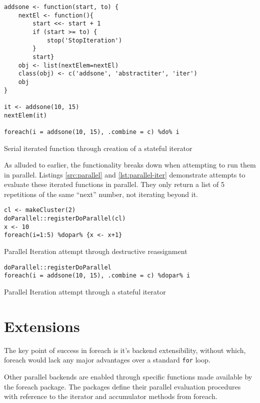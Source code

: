 \documentclass[a4paper,10pt]{article}
\begin{document}
\begin{listing}
\begin{verbatim}
addsone <- function(start, to) {
	nextEl <- function(){
		start <<- start + 1
		if (start >= to) {
			stop('StopIteration')
		}
		start}
	obj <- list(nextElem=nextEl)
	class(obj) <- c('addsone', 'abstractiter', 'iter')
	obj
}

it <- addsone(10, 15)
nextElem(it)

foreach(i = addsone(10, 15), .combine = c) %do% i
\end{verbatim}
\caption{Serial iterated function through creation of a stateful iterator}\label{src:serial-iter}
\end{listing}

As alluded to earlier, the functionality breaks down when attempting to run
them in parallel.
Listings \ref{src:parallel} and \ref{lst:parallel-iter} demonstrate attempts to
evaluate these iterated functions in parallel.
They only return a list of 5 repetitions of the same ``next'' number, not
iterating beyond it.

\begin{listing}
\begin{verbatim}
cl <- makeCluster(2)
doParallel::registerDoParallel(cl)
x <- 10
foreach(i=1:5) %dopar% {x <- x+1}
\end{verbatim}
\caption{Parallel Iteration attempt through destructive reassignment}\label{src:parallel}
\end{listing}

\begin{listing}
\begin{verbatim}
doParallel::registerDoParallel
foreach(i = addsone(10, 15), .combine = c) %dopar% i
\end{verbatim}
\caption{Parallel Iteration attempt through a stateful iterator}\label{src:parallel-iter}
\end{listing}

\section{Extensions}
\label{sec:extensions}

The key point of success in foreach is it's backend extensibility,
without which, foreach would lack any major advantages over a standard
\texttt{for} loop.

Other parallel backends are enabled through specific functions made
available by the foreach package. The packages define their parallel
evaluation procedures with reference to the iterator and accumulator
methods from foreach.
\end{document}

